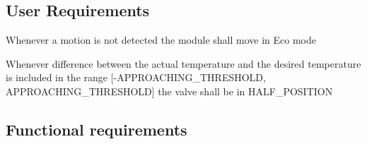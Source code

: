 \newpage
\subsection{User Requirements}
\begin{req_enum}
	\item Whenever a motion is not detected the module shall move in Eco mode
	\item Whenever difference between the actual temperature and the desired temperature is included in the range 
	[-APPROACHING\_THRESHOLD, APPROACHING\_THRESHOLD] the valve shall be in HALF\_POSITION
\end{req_enum}

\subsection{Functional requirements}
